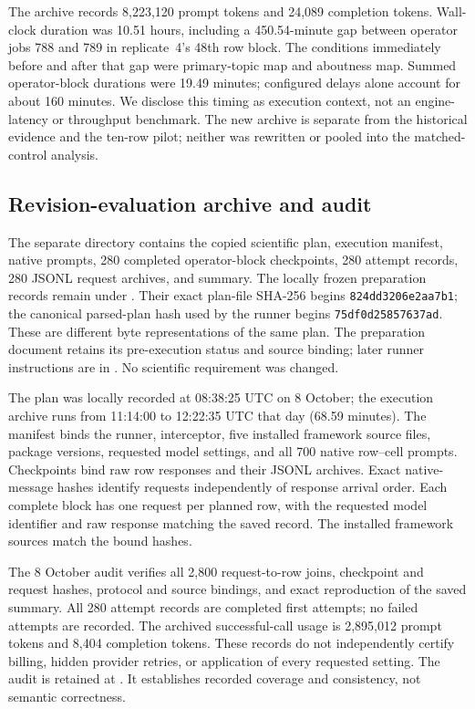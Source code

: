 \documentclass[11pt]{article}
\begin{document}
The archive records 8,223,120 prompt tokens and 24,089 completion tokens.
Wall-clock duration was 10.51 hours, including a 450.54-minute gap between
operator jobs 788 and 789 in replicate~4's 48th row block. The conditions
immediately before and after that gap were primary-topic map and aboutness
map. Summed operator-block durations were 19.49 minutes; configured delays
alone account for about 160 minutes. We disclose this timing as execution
context, not an engine-latency or throughput benchmark. The new archive is
separate from the historical evidence and the ten-row pilot; neither was
rewritten or pooled into the matched-control analysis.

\subsection{Revision-evaluation archive and audit}
\label{sec:revision-evidence}
The separate directory
 contains the copied
scientific plan, execution manifest, native prompts, 280 completed
operator-block checkpoints, 280 attempt records, 280 JSONL request archives,
and summary. The locally frozen preparation records remain under
. Their exact plan-file SHA-256
begins \texttt{824dd3206e2aa7b1}; the canonical parsed-plan hash used by the
runner begins \texttt{75df0d25857637ad}. These are different byte
representations of the same plan. The preparation document
 retains its pre-execution status and
source binding; later runner instructions are in
. No scientific requirement was changed.

The plan was locally recorded at 08:38:25 UTC on 8 October; the execution
archive runs from 11:14:00 to 12:22:35 UTC that day (68.59 minutes). The
manifest binds the runner, interceptor, five installed framework source
files, package versions, requested model settings, and all 700 native
row--cell prompts. Checkpoints bind raw row responses and their JSONL
archives. Exact native-message hashes identify requests independently of
response arrival order. Each complete block has one request per planned
row, with the requested model identifier and raw response matching the
saved record. The installed framework sources match the bound hashes.

The 8 October audit verifies all 2,800 request-to-row joins, checkpoint and
request hashes, protocol and source bindings, and exact reproduction of
the saved summary. All 280 attempt records are completed first attempts;
no failed attempts are recorded. The archived successful-call usage is
2,895,012 prompt tokens and 8,404 completion tokens. These records do not
independently certify billing, hidden provider retries, or application of
every requested setting. The audit is retained at
. It establishes
recorded coverage and consistency, not semantic correctness.
\end{document}
